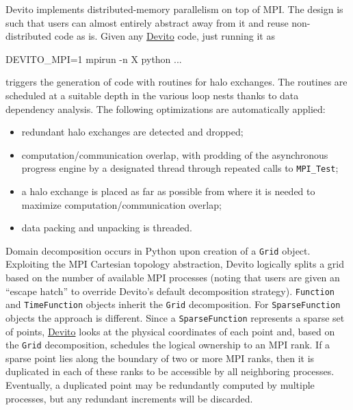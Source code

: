 \documentclass[10pt, conference]{IEEEtran}
\newenvironment{Shaded}{}{}
\newcommand{\DecValTok}[1]{\textcolor[rgb]{0.25,0.63,0.44}{{#1}}}
\newcommand{\NormalTok}[1]{{#1}}
\newcommand{\devito}{\href{https://github.com/devitocodes/devito}{Devito} }
\begin{document}
Devito implements distributed-memory parallelism on top of MPI. The design
is such that users can almost entirely abstract away from it and reuse
non-distributed code as is. Given any \devito code, just running it as

\begin{Shaded}
\begin{Highlighting}[]
\NormalTok{DEVITO_MPI=}\DecValTok{1} \NormalTok{mpirun -n X python ...}
\end{Highlighting}
\end{Shaded}

\noindent
triggers the generation of code with routines for halo exchanges. The
routines are scheduled at a suitable depth in the various loop nests
thanks to data dependency analysis. The following optimizations are
automatically applied:

\begin{itemize}
\itemsep1pt\parskip0pt
\item
  redundant halo exchanges are detected and dropped;
\item
  computation/communication overlap, with prodding of the asynchronous
  progress engine by a designated thread through repeated calls to
  \texttt{MPI\_Test};
\item
  a halo exchange is placed as far as possible from where it is needed
  to maximize computation/communication overlap;
\item
  data packing and unpacking is threaded.
\end{itemize}

Domain decomposition occurs in Python upon creation of a \texttt{Grid}
object. Exploiting the MPI Cartesian topology abstraction, Devito
logically splits a grid based on the number of available MPI processes
(noting that users are given an ``escape hatch'' to override Devito's default
decomposition strategy).  \texttt{Function} and \texttt{TimeFunction}
objects inherit the \texttt{Grid} decomposition. For
\texttt{SparseFunction} objects the approach is different. Since a
\texttt{SparseFunction} represents a sparse set of points, \devito looks at
the physical coordinates of each point and, based on the \texttt{Grid}
decomposition, schedules the logical ownership to an MPI rank. If a sparse
point lies along the boundary of two or more MPI ranks, then it is
duplicated in each of these ranks to be accessible by all neighboring
processes. Eventually, a duplicated point may be redundantly computed by
multiple processes, but any redundant increments will be discarded.
\end{document}
